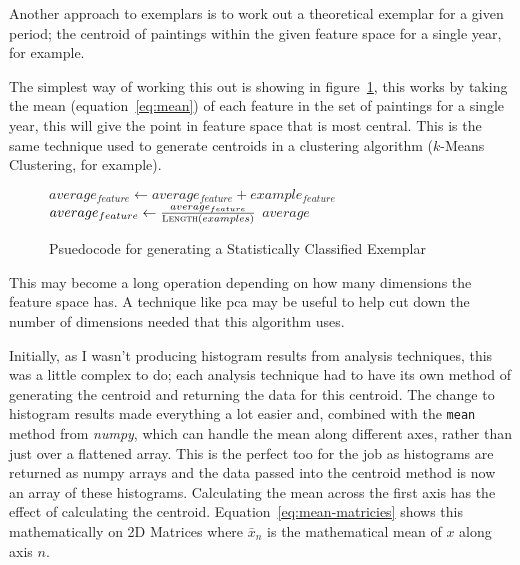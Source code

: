Another approach to exemplars is to work out a theoretical exemplar for a given period; the 
centroid of paintings within the given feature space for a single year, for example.

The simplest way of working this out is showing in figure~\ref{fig:sce-psuedo}, this works by 
taking the mean (equation~\ref{eq:mean}) of each feature in the set of paintings for a single 
year, this will give the point in feature space that is most central. This is the same technique
used to generate centroids in a clustering algorithm ($k$-Means Clustering, for example).

\begin{figure}[h]
\begin{algorithmic}
\State $average_{feature} \gets average_{feature} + example_{feature}$
\EndFor
\EndFor
{}
\State$average_{feature} \gets \frac{average_{feature}}{\Call{Length}{examples}}$
\EndFor
\State \Return $average$
\EndFunction
\end{algorithmic}
\caption{Psuedocode for generating a Statistically Classified Exemplar}\label{fig:sce-psuedo}
\end{figure}

This may become a long operation depending on how many dimensions the feature space has. A
technique like \gls{pca} may be useful to help cut down the number of dimensions needed that this
algorithm uses.

Initially, as I wasn't producing histogram results from analysis techniques, this was a little
complex to do; each analysis technique had to have its own method of generating the centroid and
returning the data for this centroid. The change to histogram results made everything a lot easier
and, combined with the \texttt{mean} method from \emph{numpy}, which can handle the mean along 
different axes, rather than just over a flattened array. This is the perfect too for the job as
histograms are returned as numpy arrays and the data passed into the centroid method is now an 
array of these histograms. Calculating the mean across the first axis has the effect of 
calculating the centroid. Equation~\ref{eq:mean-matricies} shows this mathematically on 2D 
Matrices where $\bar{x}_n$ is the mathematical mean of $x$ along axis $n$.

